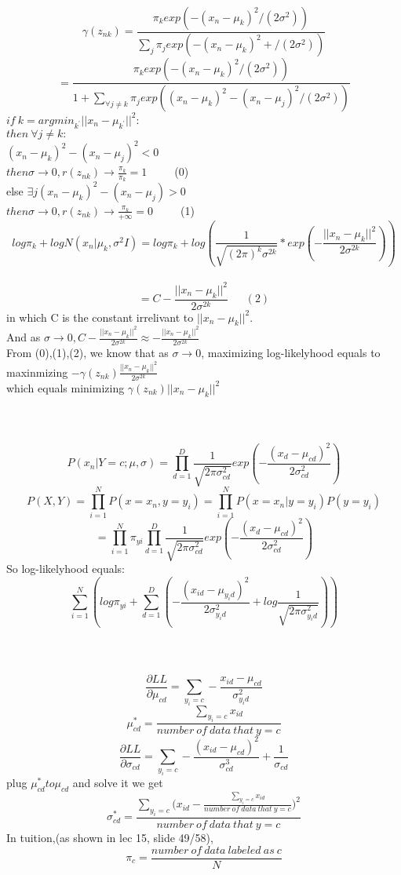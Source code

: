 \documentclass[11pt]{article}
\begin{document}
\\
		 $$\gamma(z_{nk})=\frac{\pi_kexp(-(x_n-\mu_k)^2/(2\sigma^2))}{\sum_{j}{\pi_jexp(-(x_n-\mu_k)^2+/(2\sigma^2))}}$$
 		$$=\frac{\pi_kexp(-(x_n-\mu_k)^2/(2\sigma^2))}{1+\sum_{\forall j\ne k}{\pi_jexp((x_n-\mu_k)^2-(x_n-\mu_j)^2/(2\sigma^2))}}$$
		$if\ k=argmin_{k^{'}}||x_n-\mu_{k^{'}}||^2 :$\\
		$then\ \forall j\ne k :$\\
		$(x_n-\mu_k)^2-(x_n-\mu_j)^2<0$\\
		$then \sigma\rightarrow0, r(z_{nk})\rightarrow\frac{\pi_k}{\pi_k}=1$\ \ \ \ \ (0)\\
		else $\exists j (x_n-\mu_k)^2-(x_n-\mu_j)>0$\\
		$then \sigma\rightarrow0, r(z_{nk})\rightarrow\frac{\pi_k}{+\infty}=0$\ \ \ \ \ (1)\\
		$$log\pi_k+logN(x_n|\mu_k,\sigma^2I)=log\pi_k+log(\frac{1}{\sqrt{(2\pi)^k\sigma^{2k}}}*exp(-\frac{||x_n-\mu_k||^2}{2\sigma^{2k}}))$$\\
		$$=C-\frac{||x_n-\mu_k||^2}{2\sigma^{2k}} \ \ \ \ \ \ \ (2)$$
		in which C is the constant irrelivant to $||x_n-\mu_k||^2.$\\
		And as $\sigma\rightarrow0, C-\frac{||x_n-\mu_k||^2}{2\sigma^{2k}}\approx -\frac{||x_n-\mu_k||^2}{2\sigma^{2k}}$\\
		From (0),(1),(2), we know that as $\sigma\rightarrow0$, maximizing log-likelyhood equals to maxinmizing $-\gamma(z_{nk})\frac{||x_n-\mu_k||^2}{2\sigma^{2k}} $\\
		which equals minimizing  $\gamma(z_{nk})||x_n-\mu_k||^2 $\\\\\\



\\

		$$P(x_n|Y=c;\mu,\sigma)=\prod_{d=1}^{D}{\frac{1}{\sqrt{2\pi\sigma^2_{cd}}}exp(-\frac{(x_d-\mu_{cd})^2}{2\sigma^2_{cd}})}$$
		$$P(X,Y)=\prod_{i=1}^{N}{P(x=x_n,y=y_i)}=\prod_{i=1}^{N}{P(x=x_n|y=y_i)P(y=y_i)}$$
		$$=\prod_{i=1}^{N}{\pi_{yi}\prod_{d=1}^{D}{\frac{1}{\sqrt{2\pi\sigma^2_{cd}}}exp(-\frac{(x_d-\mu_{cd})^2}{2\sigma^2_{cd}})}}$$
		So log-likelyhood equals:
		$$	\sum_{i=1}^{N}({log\pi_{yi}+\sum_{d=1}^{D}({-\frac{(x_{id}-\mu_{y_id})^2}{2\sigma_{y_id}^2}+log\frac{1}{\sqrt{2\pi\sigma_{y_id}^2}}})})$$\\\\

\\
		$$\frac{\partial{LL}}{\partial{\mu_{cd}}}=\sum_{y_i=c}-\frac{x_{id}-\mu_{cd}}{\sigma_{y_id}^2}$$
		$$\mu_{cd}^*=\frac{\sum_{y_i=c}{x_{id}}}{number \ of \ data\  that \ y=c}$$
		$$\frac{\partial{LL}}{\partial{\sigma_{cd}}}=\sum_{y_i=c}-\frac{(x_{id}-\mu_{cd})^2}{\sigma_{cd}^3}+\frac{1}{\sigma_{cd}}$$
		plug $\mu_{cd}^* to \mu_{cd}$ and solve it we get 
		$$\sigma_{cd}^*=\frac{\sum_{y_i=c}{(x_{id}-\frac{\sum_{y_i=c}{x_{id}}}{number \ of \ data\  that \ y=c}})^2}{number \ of \ data\  that \ y=c}  $$
		In tuition,(as shown in lec 15, slide 49/58),
		$$\pi_c=\frac{number\ of \ data \ labeled\ as \ c}{N}$$
		
		
     
\end{document}
